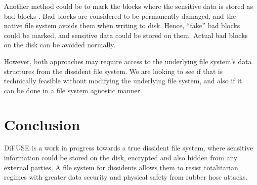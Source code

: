 \documentclass[10pt,twocolumn]{article}
\begin{document}
Another method could be to mark the blocks where the sensitive data is stored as bad blocks \cite{badblocks}. Bad blocks are considered to be permanently damaged, and the native file system avoids them when writing to disk. Hence, ``fake'' bad blocks could be marked, and sensitive data could be stored on them. Actual bad blocks on the disk can be avoided normally. 

However, both approaches may require access to the underlying file system's data structures from the dissident file system. We are looking to see if that is technically feasible without modifying the underlying file system, and also if it can be done in a file system agnostic manner. 

\section{Conclusion}

DiFUSE is a work in progress towards a true dissident file system, where sensitive information could be stored on the disk, encrypted and also hidden from any external parties. A file system for dissidents allows them to resist totalitarian regimes with greater data security and physical safety from rubber hose attacks. 



\end{document}
